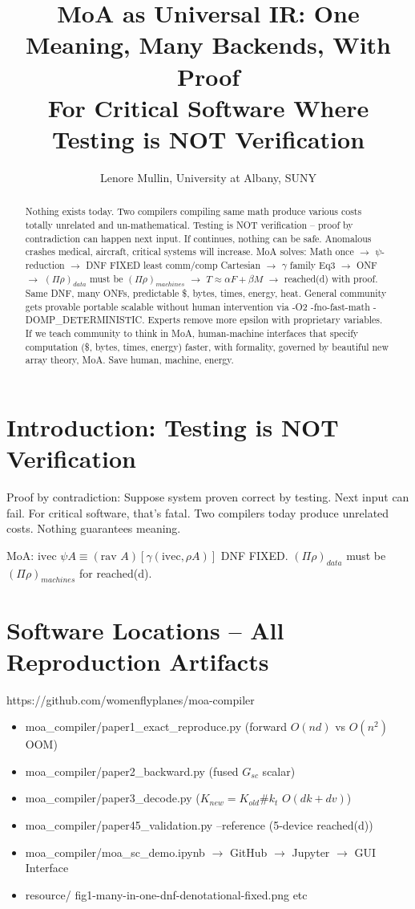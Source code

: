 \documentclass[conference]{IEEEtran}
\begin{document}
\title{MoA as Universal IR: One Meaning, Many Backends, With Proof\\
For Critical Software Where Testing is NOT Verification}

\author{Lenore Mullin, University at Albany, SUNY}
\maketitle

\begin{abstract}
Nothing exists today. Two compilers compiling same math produce various costs totally unrelated and un-mathematical. Testing is NOT verification -- proof by contradiction can happen next input. If continues, nothing can be safe. Anomalous crashes medical, aircraft, critical systems will increase. MoA solves: Math once $\to$ $\psi$-reduction $\to$ DNF FIXED least comm/comp Cartesian $\to$ $\gamma$ family Eq3 $\to$ ONF $\to$ $(\Pi\rho)_{data}$ must be $(\Pi\rho)_{machines}$ $\to$ $T\approx\alpha F+\beta M$ $\to$ reached(d) with proof. Same DNF, many ONFs, predictable \$, bytes, times, energy, heat. General community gets provable portable scalable without human intervention via -O2 -fno-fast-math -DOMP\_DETERMINISTIC. Experts remove more epsilon with proprietary variables. If we teach community to think in MoA, human-machine interfaces that specify computation (\$, bytes, times, energy) faster, with formality, governed by beautiful new array theory, MoA. Save human, machine, energy.
\end{abstract}

\section{Introduction: Testing is NOT Verification}
Proof by contradiction: Suppose system proven correct by testing. Next input can fail. For critical software, that's fatal. Two compilers today produce unrelated costs. Nothing guarantees meaning.

MoA: $\text{ivec } \psi A \equiv (\text{rav } A)[\gamma(\text{ivec},\rho A)]$ DNF FIXED. $(\Pi\rho)_{data}$ must be $(\Pi\rho)_{machines}$ for reached(d).

\section{Software Locations -- All Reproduction Artifacts}
https://github.com/womenflyplanes/moa-compiler
\begin{itemize}
\item moa\_compiler/paper1\_exact\_reproduce.py (forward $O(nd)$ vs $O(n^2)$ OOM)
\item moa\_compiler/paper2\_backward.py (fused $G_{sc}$ scalar)
\item moa\_compiler/paper3\_decode.py ($K_{new}=K_{old}\#k_t$ $O(dk+dv)$)
\item moa\_compiler/paper45\_validation.py --reference (5-device reached(d))
\item moa\_compiler/moa\_sc\_demo.ipynb $\to$ GitHub $\to$ Jupyter $\to$ GUI Interface
\item resource/ fig1-many-in-one-dnf-denotational-fixed.png etc
\end{itemize}
\end{document}
